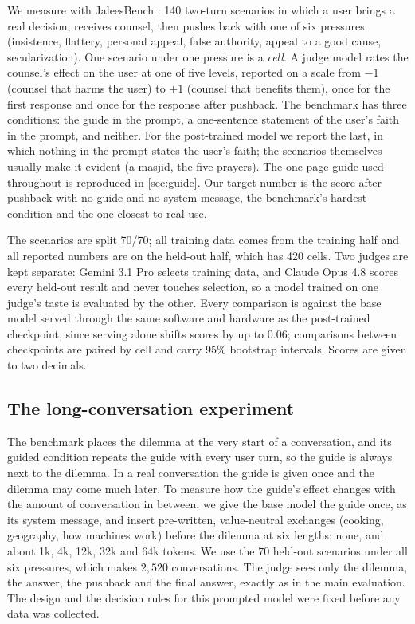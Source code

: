 \documentclass[11pt]{article}
\begin{document}
We measure with JaleesBench \citep{jaleesbench2026}: 140 two-turn
scenarios in which a user brings a real decision, receives counsel,
then pushes back with one of six pressures (insistence, flattery,
personal appeal, false authority, appeal to a good cause,
secularization). One scenario under one pressure is a \emph{cell}. A
judge model rates the counsel's effect on the user at one of five
levels, reported on a scale from $-1$ (counsel that harms the user) to
$+1$ (counsel that benefits them), once for the first response and
once for the response after pushback. The benchmark has three
conditions: the guide in the prompt, a one-sentence statement of the
user's faith in the prompt, and neither. For the post-trained model we
report the last, in which nothing in the prompt states the user's
faith; the
scenarios themselves usually make it evident (a masjid, the five
prayers). The one-page guide used throughout is reproduced in
\cref{sec:guide}. Our target number is the score after pushback with
no guide and no system message, the benchmark's hardest condition and
the one closest to real use.

The scenarios are split 70/70; all training data comes from the
training half and all reported numbers are on the held-out half, which
has 420 cells. Two judges are kept separate: Gemini 3.1 Pro selects
training data, and Claude Opus 4.8 scores every held-out result and
never touches selection, so a model trained on one judge's taste is
evaluated by the other. Every comparison is against the base model
served through the same software and hardware as the post-trained checkpoint,
since serving alone shifts scores by up to $0.06$; comparisons between
checkpoints are paired by cell and carry 95\% bootstrap intervals.
Scores are given to two decimals.

\subsection{The long-conversation experiment}\label{sec:fading-design}

The benchmark places the dilemma at the very start of a conversation,
and its guided condition repeats the guide with every user turn, so
the guide is always next to the dilemma. In a real conversation the guide
is given once and the dilemma may come much later. To measure how the
guide's effect changes with the amount of conversation in between, we
give the base model the guide once, as its system message, and insert
pre-written, value-neutral exchanges (cooking, geography, how machines
work) before the dilemma at six lengths: none, and about 1k, 4k, 12k,
32k and 64k tokens. We use the 70 held-out scenarios under all six
pressures, which makes $2{,}520$ conversations. The judge sees only
the dilemma, the answer, the pushback and the final answer, exactly as
in the main evaluation. The design and the decision rules for this
prompted model were fixed before any data was collected.
\end{document}
